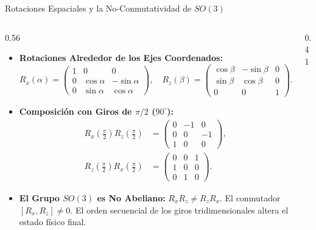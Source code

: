 \documentclass[10pt,aspectratio=169]{beamer}
\begin{document}
\begin{frame}{Rotaciones Espaciales y la No-Conmutatividad de $SO(3)$}
  \begin{columns}[c]
    \begin{column}{0.56\textwidth}
      \footnotesize
      \begin{itemize}\itemsep3pt
        \item \textbf{Rotaciones Alrededor de los Ejes Coordenados:}
        {\tiny
        \[
        R_x(\alpha) = \begin{pmatrix} 1 & 0 & 0 \\ 0 & \cos\alpha & -\sin\alpha \\ 0 & \sin\alpha & \cos\alpha \end{pmatrix}, \quad
        R_z(\beta) = \begin{pmatrix} \cos\beta & -\sin\beta & 0 \\ \sin\beta & \cos\beta & 0 \\ 0 & 0 & 1 \end{pmatrix}.
        \]
        }
        \item \textbf{Composición con Giros de $\pi/2$ ($90^\circ$):}
        {\scriptsize
        \begin{align*}
        R_x\left(\frac{\pi}{2}\right) R_z\left(\frac{\pi}{2}\right) &= \begin{pmatrix} 0 & -1 & 0 \\ 0 & 0 & -1 \\ 1 & 0 & 0 \end{pmatrix}, \\
        R_z\left(\frac{\pi}{2}\right) R_x\left(\frac{\pi}{2}\right) &= \begin{pmatrix} 0 & 0 & 1 \\ 1 & 0 & 0 \\ 0 & 1 & 0 \end{pmatrix}.
        \end{align*}
        }
        \item \textbf{El Grupo $SO(3)$ es No Abeliano:}
        $R_x R_z \neq R_z R_x$. El conmutador $[R_x, R_z] \neq 0$.
        El orden secuencial de los giros tridimensionales altera el estado físico final.
      \end{itemize}
    \end{column}
    \begin{column}{0.41\textwidth}
      \centering
\end{column}
\end{columns}
\end{frame}
\end{document}
